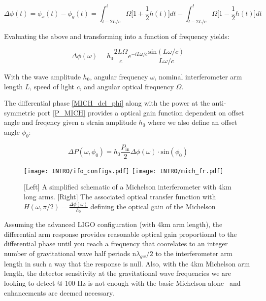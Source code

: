 \begin{equation}
\Delta \phi(t) = \phi_x(t) - \phi_y(t) =  \int_{t-2L/c}^{t} \Omega \bigg[1 + \frac{1}{2}h(t)\bigg]dt - \int_{t-2L/c}^{t} \Omega \bigg[1 - \frac{1}{2}h(t)\bigg]dt 
\end{equation}

Evaluating the above and transforming into a function of frequency yields:

\begin{equation}
\Delta \phi (\omega) = h_0\frac{2 L \Omega}{c}e^{-i L \omega / c} \frac{\mathrm{sin}(L \omega /c)}{L \omega /c}
\end{equation}

With the wave amplitude $h_0$, angular frequency $\omega$, nominal interferometer arm length $L$, speed of light $c$, and angular optical frequency $\Omega$.

The differential phase \ref{MICH_del_phi} along with the power at the anti-symmetric port \ref{P_MICH} provides a optical gain function dependent on offset angle and freqency given a strain amplitude $h_0$ where we also define an offset angle $\phi_0$:

\begin{equation}
	\Delta P(\omega, \phi_0) = h_0 \frac{P_\mathrm{in}}{2} \Delta \phi (\omega) \cdot \mathrm{sin}(\phi_0)
\end{equation}

\begin{figure}[ht!]
	\begin{subcaptiongroup}
		\texttt{[image: INTRO/ifo\_configs.pdf]}
		\texttt{[image: INTRO/mich\_fr.pdf]}
 	\end{subcaptiongroup}
  	\hfill
	\caption{[Left] A simplified schematic of a Michelson interferometer with 4km long arms. [Right] The associated optical transfer function with $H(\omega, \pi/2) = \frac{\Delta \phi (\omega)}{h_0}$ defining the optical gain of the Michelson }
	\label{fig:mich}
\end{figure}
\FloatBarrier

Assuming the advanced LIGO configuration (with 4km arm length), the differential arm response provides reasonable optical gain proportional to the differential phase until you reach a frequency that coorelates to an integer number of gravitational wave half periods $\mathrm{n}\lambda_{gw} / 2$ to the interferometer arm length in such a way that the response is null. Also, with the 4km Michelson arm length, the detector sensitivity at the gravitational wave frequencies we are looking to detect @ 100 Hz is not enough with the basic Michelson alone~\cite{} and enhancements are deemed necessary. 

